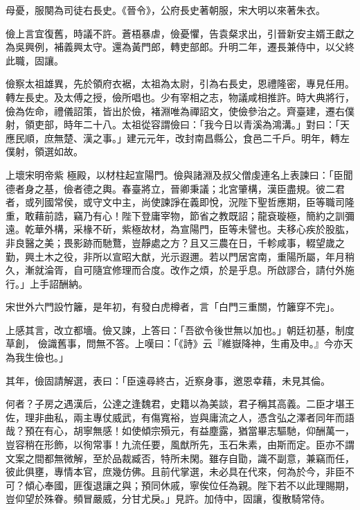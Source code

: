 \begin{pinyinscope}
 母憂，服闋為司徒右長史。《晉令》，公府長史著朝服，宋大明以來著朱衣。



 儉上言宜復舊，時議不許。蒼梧暴虐，儉憂懼，告袁粲求出，引晉新安主婿王獻之為吳興例，補義興太守。還為黃門郎，轉吏部郎。升明二年，遷長兼侍中，以父終此職，固讓。



 儉察太祖雄異，先於領府衣裾，太祖為太尉，引為右長史，恩禮隆密，專見任用。轉左長史。及太傅之授，儉所唱也。少有宰相之志，物議咸相推許。時大典將行，儉為佐命，禮儀詔策，皆出於儉，褚淵唯為禪詔文，使儉參治之。齊臺建，遷右僕射，領吏部，時年二十八。太祖從容謂儉曰：「我今日以青溪為鴻溝。」對曰：「天應民順，庶無楚、漢之事。」建元元年，改封南昌縣公，食邑二千戶。明年，轉左僕射，領選如故。



 上壞宋明帝紫
 極殿，以材柱起宣陽門。儉與諸淵及叔父僧虔連名上表諫曰：「臣聞德者身之基，儉者德之輿。春臺將立，晉卿秉議；北宮肇構，漢臣盡規。彼二君者，或列國常侯，或守文中主，尚使諫諍在義即悅，況陛下聖哲應期，臣等職司隆重，敢藉前誥，竊乃有心！陛下登庸宰物，節省之教既詔；龍袞璇極，簡約之訓彌遠。乾華外構，采椽不斫，紫極故材，為宣陽門，臣等未譬也。夫移心疾於股肱，非良醫之美；畏影跡而馳鶩，豈靜處之方？且又三農在日，千軫咸事，輟望歲之勤，興土木之役，非所以宣昭大猷，光示遐邇。若以門居宮南，重陽所屬，年月稍久，漸就淪胥，自可隨宜修理而合度。改作之煩，於是乎息。所啟謬合，請付外施行。」上手詔酬納。



 宋世外六門設竹籬，是年初，有發白虎樽者，言「白門三重關，竹籬穿不完」。



 上感其言，改立都墻。儉又諫，上答曰：「吾欲令後世無以加也。」朝廷初基，制度草創，
 儉識舊事，問無不答。上嘆曰：「《詩》云『維嶽降神，生甫及申。』今亦天為我生儉也。」



 其年，儉固請解選，表曰：「臣遠尋終古，近察身事，邀恩幸藉，未見其倫。



 何者？子房之遇漢后，公達之逢魏君，史籍以為美談，君子稱其高義。二臣才堪王佐，理非曲私，兩主專仗威武，有傷寬裕，豈與庸流之人，憑含弘之澤者同年而語哉？預在有心，胡寧無感！如使傾宗殞元，有益塵露，猶當畢志驅馳，仰酬萬一，豈容稍在形飾，以徇常事！九流任要，風猷所先，玉石朱素，由斯而定。臣亦不謂文案之間都無微解，至於品裁臧否，特所未閑。雖存自勖，識不副意，兼竊而任，彼此俱壅，專情本官，庶幾仿佛。且前代掌選，未必具在代來，何為於今，非臣不可？傾心奉國，匪復退讓之與；預同休戚，寧俟位任為親。陛下若不以此理賜期，豈仰望於殊眷。頻冒嚴威，分甘尤戾。」見許。加侍中，固讓，復散騎常侍。




\end{pinyinscope}
